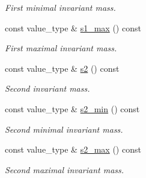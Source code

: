 \begin{DoxyCompactItemize}
\begin{DoxyCompactList}\small\item\em First minimal invariant mass. \end{DoxyCompactList}\item 
\hypertarget{a00495_a7ffdaf3b3e5028998f12ec9b4e0b25b4}{}const value\+\_\+type \& \hyperlink{a00495_a7ffdaf3b3e5028998f12ec9b4e0b25b4}{s1\+\_\+max} () const \label{a00495_a7ffdaf3b3e5028998f12ec9b4e0b25b4}

\begin{DoxyCompactList}\small\item\em First maximal invariant mass. \end{DoxyCompactList}\item 
\hypertarget{a00495_ab034a7c12fb39fa2b9c850a5af161fa1}{}const value\+\_\+type \& \hyperlink{a00495_ab034a7c12fb39fa2b9c850a5af161fa1}{s2} () const \label{a00495_ab034a7c12fb39fa2b9c850a5af161fa1}

\begin{DoxyCompactList}\small\item\em Second invariant mass. \end{DoxyCompactList}\item 
\hypertarget{a00495_aa6a44bc7458bd484f755b1717c5de3be}{}const value\+\_\+type \& \hyperlink{a00495_aa6a44bc7458bd484f755b1717c5de3be}{s2\+\_\+min} () const \label{a00495_aa6a44bc7458bd484f755b1717c5de3be}

\begin{DoxyCompactList}\small\item\em Second minimal invariant mass. \end{DoxyCompactList}\item 
\hypertarget{a00495_a26404278a46531e0e163266ef72ca1d2}{}const value\+\_\+type \& \hyperlink{a00495_a26404278a46531e0e163266ef72ca1d2}{s2\+\_\+max} () const \label{a00495_a26404278a46531e0e163266ef72ca1d2}

\begin{DoxyCompactList}\small\item\em Second maximal invariant mass. \end{DoxyCompactList}\end{DoxyCompactItemize}
